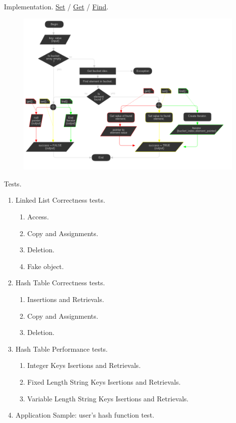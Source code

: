 \documentclass{beamer}
\begin{document}
\begin{frame}{Implementation.}{
    \href{http://localhost/esr/classesr\_1\_1\_hashtable.html\#a98be284a32aa6df71f6a57131e47f2c1}{Set} /
    \href{http://localhost/esr/classesr\_1\_1\_hashtable.html\#a602f3dc37d1b106c8af052c9c355c4f6}{Get} /
    \href{http://localhost/esr/classesr\_1\_1\_hashtable.html\#a2c3d128f86781b4b2ff65a0f6da812c8}{Find}.}
  \begin{figure}
    \includegraphics[scale=0.3]{pictures/implementation_set_get_find_flowchart}
  \end{figure}
\end{frame}

\begin{frame}{Tests.}
  \begin{enumerate}
  \item Linked List Correctness tests.
    \begin{enumerate}
    \item Access.
    \item Copy and Assignments.
    \item Deletion.
    \item Fake object.
    \end{enumerate}

  \item Hash Table Correctness tests.
    \begin{enumerate}
    \item Insertions and Retrievals.
    \item Copy and Assignments.
    \item Deletion.
    \end{enumerate}
  \item Hash Table Performance tests.
    \begin{enumerate}
    \item Integer Keys Isertions and Retrievals.
    \item Fixed Length String Keys Isertions and Retrievals.
    \item Variable Length String Keys Isertions and Retrievals.
    \end{enumerate}
  \item Application Sample: user's hash function test.
  \end{enumerate}
\end{frame}
\end{document}
